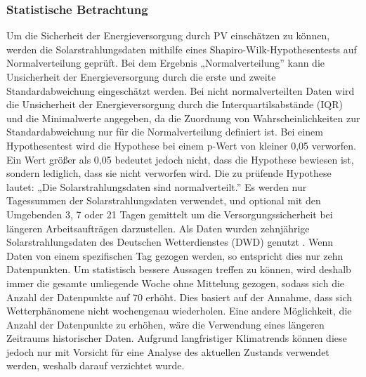 \subsubsection{Statistische Betrachtung} \label{stats}
Um die Sicherheit der Energieversorgung durch PV einschätzen zu können, werden die Solarstrahlungsdaten mithilfe eines Shapiro-Wilk-Hypothesentests auf Normalverteilung geprüft. Bei dem Ergebnis „Normalverteilung” kann die Unsicherheit der Energieversorgung durch die erste und zweite Standardabweichung eingeschätzt werden. Bei nicht normalverteilten Daten wird die Unsicherheit der Energieversorgung durch die Interquartilsabstände (IQR) und die Minimalwerte angegeben, da die Zuordnung von Wahrscheinlichkeiten zur Standardabweichung nur für die Normalverteilung definiert ist. Bei einem Hypothesentest wird die Hypothese bei einem p-Wert von kleiner 0,05 verworfen. Ein Wert größer als 0,05 bedeutet jedoch nicht, dass die Hypothese bewiesen ist, sondern lediglich, dass sie nicht verworfen wird. Die zu prüfende Hypothese lautet: „Die Solarstrahlungsdaten sind normalverteilt.” Es werden nur Tagessummen der Solarstrahlungsdaten verwendet, und optional mit den Umgebenden 3, 7 oder 21 Tagen gemittelt um die Versorgungssicherheit bei längeren Arbeitsaufträgen darzustellen. Als Daten wurden zehnjährige Solarstrahlungsdaten des Deutschen Wetterdienstes (DWD) genutzt \cite{DWD2024Solar10min}. Wenn Daten von einem spezifischen Tag gezogen werden, so entspricht dies nur zehn Datenpunkten. Um statistisch bessere Aussagen treffen zu können, wird deshalb immer die gesamte umliegende Woche ohne Mittelung gezogen, sodass sich die Anzahl der Datenpunkte auf 70 erhöht. Dies basiert auf der Annahme, dass sich Wetterphänomene nicht wochengenau wiederholen. Eine andere Möglichkeit, die Anzahl der Datenpunkte zu erhöhen, wäre die Verwendung eines längeren Zeitraums historischer Daten. Aufgrund langfristiger Klimatrends können diese jedoch nur mit Vorsicht für eine Analyse des aktuellen Zustands verwendet werden, weshalb darauf verzichtet wurde.

